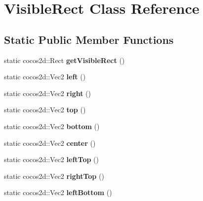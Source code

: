 \hypertarget{classVisibleRect}{}\section{Visible\+Rect Class Reference}
\label{classVisibleRect}
\subsection*{Static Public Member Functions}
\begin{DoxyCompactItemize}
\item 
\mbox{\label{classVisibleRect_a1ba52ddee58abe89dd6f23218dca6ee3}} 
static cocos2d\+::\+Rect {\bfseries get\+Visible\+Rect} ()
\item 
\mbox{\label{classVisibleRect_ac7a24b52d9e5a76cedddbae566ce6ad3}} 
static cocos2d\+::\+Vec2 {\bfseries left} ()
\item 
\mbox{\label{classVisibleRect_af523aaf1404f15660a05aed491e794d6}} 
static cocos2d\+::\+Vec2 {\bfseries right} ()
\item 
\mbox{\label{classVisibleRect_a10972eac2f46a7e55b2f5a842771aa63}} 
static cocos2d\+::\+Vec2 {\bfseries top} ()
\item 
\mbox{\label{classVisibleRect_aa1a6a8fd3756c8384604619d48338e52}} 
static cocos2d\+::\+Vec2 {\bfseries bottom} ()
\item 
\mbox{\label{classVisibleRect_a6fe2c406aedafa231dad8cce78891e64}} 
static cocos2d\+::\+Vec2 {\bfseries center} ()
\item 
\mbox{\label{classVisibleRect_a69e72bd55a7026baf45c9ab9da749063}} 
static cocos2d\+::\+Vec2 {\bfseries left\+Top} ()
\item 
\mbox{\label{classVisibleRect_abb81d6130a770b05da66711f10f29895}} 
static cocos2d\+::\+Vec2 {\bfseries right\+Top} ()
\item 
\mbox{\label{classVisibleRect_ad046e7f3f7a6658e613371b67e6cd080}} 
static cocos2d\+::\+Vec2 {\bfseries left\+Bottom} ()

\end{DoxyCompactItemize}

